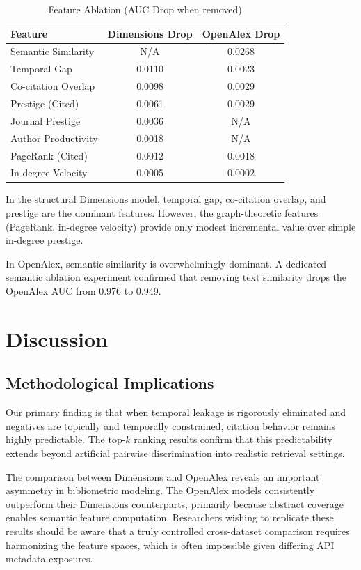 \documentclass[11pt,a4paper]{article}
\begin{document}
\begin{table}[H]
\centering
\caption{Feature Ablation (AUC Drop when removed)}
\label{tab:ablation}
\begin{tabular}{lcc}
\toprule
\textbf{Feature} & \textbf{Dimensions Drop} & \textbf{OpenAlex Drop} \\
\midrule
Semantic Similarity & N/A & 0.0268 \\
Temporal Gap & 0.0110 & 0.0023 \\
Co-citation Overlap & 0.0098 & 0.0029 \\
Prestige (Cited) & 0.0061 & 0.0029 \\
Journal Prestige & 0.0036 & N/A \\
Author Productivity & 0.0018 & N/A \\
PageRank (Cited) & 0.0012 & 0.0018 \\
In-degree Velocity & 0.0005 & 0.0002 \\
\bottomrule
\end{tabular}
\end{table}

In the structural Dimensions model, temporal gap, co-citation overlap, and prestige are the dominant features. However, the graph-theoretic features (PageRank, in-degree velocity) provide only modest incremental value over simple in-degree prestige. 

In OpenAlex, semantic similarity is overwhelmingly dominant. A dedicated semantic ablation experiment confirmed that removing text similarity drops the OpenAlex AUC from 0.976 to 0.949.

\section{Discussion}
\label{sec:discussion}

\subsection{Methodological Implications}
Our primary finding is that when temporal leakage is rigorously eliminated and negatives are topically and temporally constrained, citation behavior remains highly predictable. The top-$k$ ranking results confirm that this predictability extends beyond artificial pairwise discrimination into realistic retrieval settings. 

The comparison between Dimensions and OpenAlex reveals an important asymmetry in bibliometric modeling. The OpenAlex models consistently outperform their Dimensions counterparts, primarily because abstract coverage enables semantic feature computation. Researchers wishing to replicate these results should be aware that a truly controlled cross-dataset comparison requires harmonizing the feature spaces, which is often impossible given differing API metadata exposures.
\end{document}
